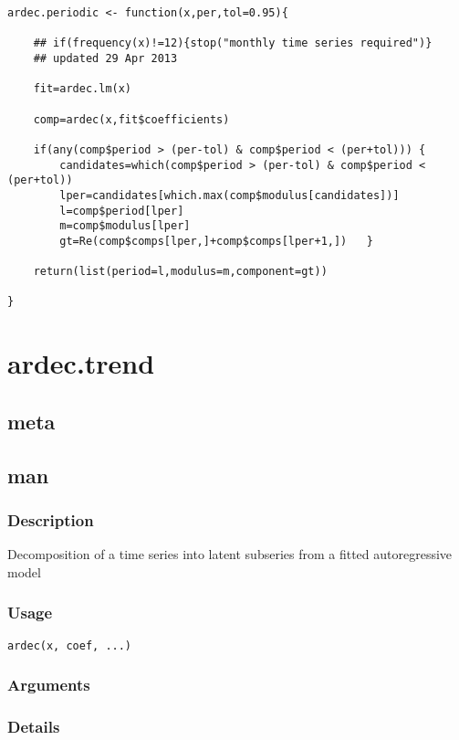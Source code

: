 \documentclass[11pt]{article}
\begin{document}
\lstset{language=R,numbers=none}
\begin{lstlisting}
ardec.periodic <- function(x,per,tol=0.95){

    ## if(frequency(x)!=12){stop("monthly time series required")}
    ## updated 29 Apr 2013

    fit=ardec.lm(x)

    comp=ardec(x,fit$coefficients)

    if(any(comp$period > (per-tol) & comp$period < (per+tol))) {
        candidates=which(comp$period > (per-tol) & comp$period < (per+tol))
        lper=candidates[which.max(comp$modulus[candidates])]
        l=comp$period[lper]
        m=comp$modulus[lper]
        gt=Re(comp$comps[lper,]+comp$comps[lper+1,])   }

    return(list(period=l,modulus=m,component=gt))

}
\end{lstlisting}
\section{ardec.trend}
\label{sec-4}
\subsection{meta}
\label{sec-4-1}
\subsection{man}
\label{sec-4-2}
\subsubsection{Description}
\label{sec-4-2-1}

Decomposition of a time series into latent subseries from a fitted
autoregressive model
\subsubsection{Usage}
\label{sec-4-2-2}

\begin{verbatim}
ardec(x, coef, ...)
\end{verbatim}
\subsubsection{Arguments}
\label{sec-4-2-3}
\subsubsection{Details}
\label{sec-4-2-4}
\end{document}

